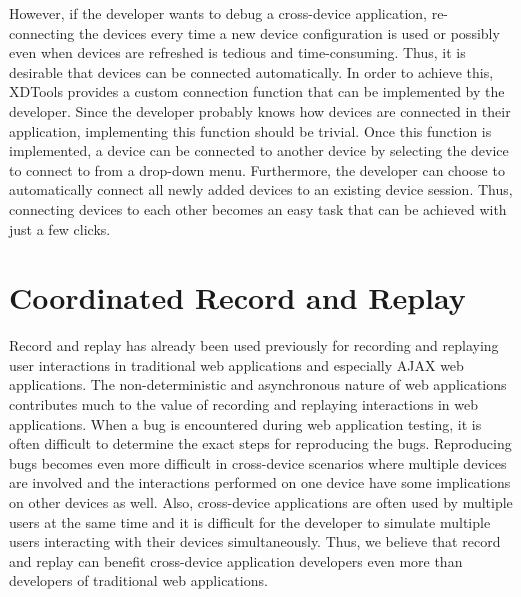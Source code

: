 However, if the developer wants to debug a cross-device application, re-connecting the devices every time a new device configuration is used or possibly even when devices are refreshed is tedious and time-consuming. Thus, it is desirable that devices can be connected automatically. In order to achieve this, XDTools provides a custom connection function that can be implemented by the developer. Since the developer probably knows how devices are connected in their application, implementing this function should be trivial. Once this function is implemented, a device can be connected to another device by selecting the device to connect to from a drop-down menu. Furthermore, the developer can choose to automatically connect all newly added devices to an existing device session. Thus, connecting devices to each other becomes an easy task that can be achieved with just a few clicks.

\section{Coordinated Record and Replay}

Record and replay has already been used previously for recording and replaying user interactions in traditional web applications and especially AJAX web applications. The non-deterministic and asynchronous nature of web applications contributes much to the value of recording and replaying interactions in web applications. When a bug is encountered during web application testing, it is often difficult to determine the exact steps for reproducing the bugs. Reproducing bugs becomes even more difficult in cross-device scenarios where multiple devices are involved and the interactions performed on one device have some implications on other devices as well. Also, cross-device applications are often used by multiple users at the same time and it is difficult for the developer to simulate multiple users interacting with their devices simultaneously. Thus, we believe that record and replay can benefit cross-device application developers even more than developers of traditional web applications.

